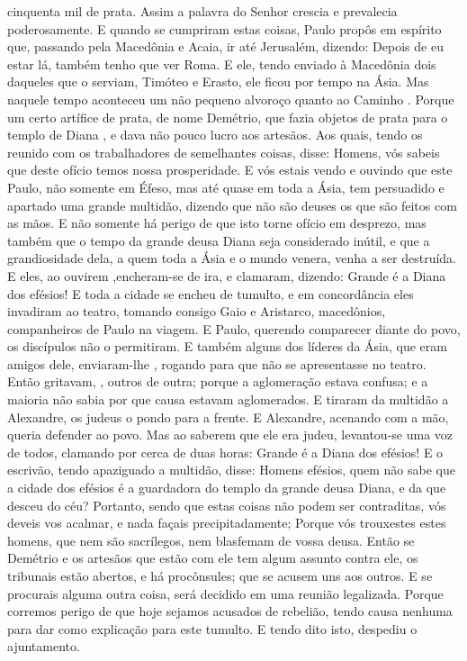 {{} cinquenta mil
{} de prata.
Assim a palavra do Senhor crescia e prevalecia poderosamente.
E quando se cumpriram estas coisas, Paulo propôs em espírito que, passando pela Macedônia e Acaia, ir até Jerusalém, dizendo: Depois de eu estar lá, também tenho que ver Roma.
E ele, tendo enviado à Macedônia dois daqueles que o serviam, Timóteo e Erasto, ele ficou por
{} tempo na Ásia.
Mas naquele tempo aconteceu um não pequeno alvoroço quanto ao Caminho
 .
Porque um certo artífice de prata, de nome Demétrio, que fazia objetos de prata para o templo de Diana
 , e dava não pouco lucro aos artesãos.
Aos quais, tendo os reunido com os trabalhadores de semelhantes coisas, disse: Homens, vós sabeis que deste ofício temos nossa prosperidade.
E vós estais vendo e ouvindo que este Paulo, não somente em Éfeso, mas até quase em toda a Ásia, tem persuadido e apartado uma grande multidão, dizendo que não são deuses os que são feitos com as mãos.
E não somente há perigo de que isto torne
{} ofício em desprezo, mas também que
{} o tempo da grande deusa Diana seja considerado inútil, e que a grandiosidade dela, a quem toda a Ásia e o mundo venera, venha a ser destruída.
E eles, ao ouvirem
{} ,encheram-se de ira, e clamaram, dizendo: Grande é a Diana dos efésios!
E toda a cidade se encheu de tumulto, e em concordância eles invadiram ao teatro, tomando consigo Gaio e Aristarco, macedônios, companheiros de Paulo na viagem.
E Paulo, querendo comparecer diante do povo, os discípulos não o permitiram.
E também alguns dos líderes da Ásia, que eram amigos dele, enviaram-lhe
{} , rogando{} para que não se apresentasse no teatro.
Então gritavam,
{} , outros de outra; porque a aglomeração estava confusa; e a maioria não sabia por que causa estavam aglomerados.
E tiraram da multidão a Alexandre, os judeus o pondo para a frente. E Alexandre, acenando com a mão, queria
{} defender ao povo.
Mas ao saberem que ele era judeu, levantou-se uma voz de todos, clamando por cerca de duas horas: Grande é a Diana dos efésios!
E o escrivão, tendo apaziguado a multidão, disse: Homens efésios, quem não sabe que a cidade dos efésios é a guardadora do templo da grande deusa Diana, e da
{} que desceu do céu?
Portanto, sendo que estas coisas não podem ser contraditas, vós deveis vos acalmar, e nada façais precipitadamente;
Porque vós trouxestes
{} estes homens, que nem são sacrílegos, nem blasfemam de vossa deusa.
Então se Demétrio e os artesãos que estão com ele tem algum assunto contra ele, os tribunais estão abertos, e há procônsules; que se acusem uns aos outros.
E se procurais alguma outra coisa, será decidido em uma reunião legalizada.
Porque corremos perigo de que hoje sejamos acusados de rebelião, tendo causa nenhuma para dar como explicação para este tumulto.
E tendo dito isto, despediu o ajuntamento.

}

